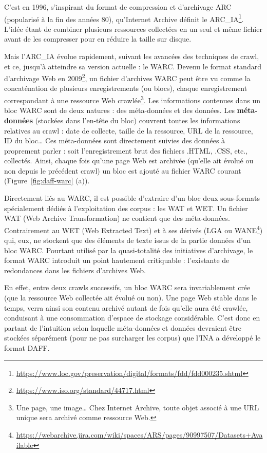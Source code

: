 \documentclass[symmetric,justified,marginals=raggedouter]{tufte-book}
\begin{document}
C'est en 1996, s'inspirant du format de compression et d'archivage ARC (popularisé à la fin des années 80), qu'Internet Archive définit le ARC\_IA\footnote{\RaggedOuter \url{https://www.loc.gov/preservation/digital/formats/fdd/fdd000235.shtml}}. L'idée étant de combiner plusieurs ressources collectées en un seul et même fichier avant de les compresser pour en réduire la taille sur disque.

Mais l'ARC\_IA évolue rapidement, suivant les avancées des techniques de crawl, et ce, jusqu'à atteindre sa version actuelle : le WARC. Devenu le format standard d'archivage Web en 2009\footnote{\RaggedOuter \url{https://www.iso.org/standard/44717.html}}, un fichier d'ar\-chives WARC peut être vu comme la concaténation de plusieurs enregistrements (ou blocs), chaque enregistrement correspondant à une ressource Web crawlée\footnote{\RaggedOuter Une page, une image\ldots{} Chez Internet Archive, toute objet associé à une URL unique sera archivé comme ressource Web.}. Les informations contenues dans un bloc WARC sont de deux natures : des méta-données et des données. Les \textbf{méta-données} (stockées dans l'en-tête du bloc) couvrent toutes les informations relatives au crawl : date de collecte, taille de la ressource, URL de la ressource, ID du bloc\ldots{} Ces méta-données sont directement suivies des données à proprement parler : soit l'enregistrement brut des fichiers .HTML, .CSS, etc., collectés. Ainsi, chaque fois qu'une page Web est archivée (qu'elle ait évolué ou non depuis le précédent crawl) un bloc est ajouté au fichier WARC courant (Figure~\ref{fig:daff-warc} (a)). 

Directement liés au WARC, il est possible d'extraire d'un bloc deux sous-formats spécialement dédiés à l'exploitation des corpus : les WAT et WET. Un fichier WAT (Web Archive Transformation) ne contient que des méta-données. Contrairement au WET (Web Extracted Text) et à ses dérivés (LGA ou WANE\footnote{\RaggedOuter \url{https://webarchive.jira.com/wiki/spaces/ARS/pages/90997507/Datasets+Available}}) qui, eux, ne stockent que des éléments de texte issus de la partie données d'un bloc WARC. Pourtant utilisé par la quasi-totalité des initiatives d'archivage, le format WARC introduit un point hautement critiquable : l'existante de redondances dans les fichiers d'archives Web.

En effet, entre deux crawls successifs, un bloc WARC sera invariablement crée (que la ressource Web collectée ait évolué ou non). Une page Web stable dans le temps, verra ainsi son contenu archivé autant de fois qu'elle aura été crawlée, conduisant à une consommation d'espace de stockage considérable. C'est donc en partant de l'intuition selon laquelle méta-données et données devraient être stockées séparément (pour ne pas surcharger les corpus) que l'INA a développé le format DAFF.  
\end{document}
